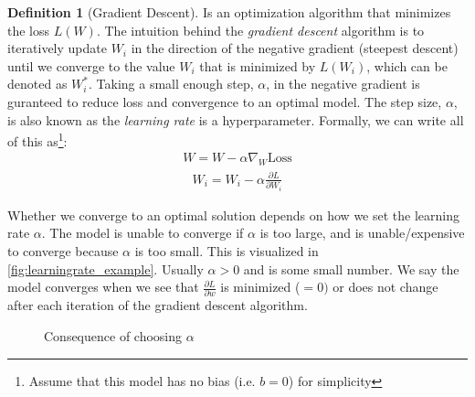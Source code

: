 \documentclass[11pt]{article}
\numberwithin{equation}{section}
\theoremstyle{definition}%
\newtheorem{definition}{Definition}[section]%
\begin{document}
\begin{definition}[Gradient Descent]
    Is an optimization algorithm that minimizes the loss $L(W)$. The intuition behind the \emph{gradient descent} algorithm is to iteratively update $W_i$ in the direction of the negative gradient (steepest descent) until we converge to the value $W_i$ that is minimized by $L(W_i)$, which can be denoted as $W_i^{\ast}$.  Taking a small enough step, $\alpha$, in the negative gradient is guranteed to reduce loss and convergence to an optimal model. The step size, $\alpha$, is also known as the \emph{learning rate} is a hyperparameter. Formally, we can write all of this as\footnote{Assume that this model has no bias (i.e. $b=0$) for simplicity}:
    \begin{align}
        W = W - \alpha \nabla_W \text{Loss}  
    \end{align}
    \begin{align}
        W_i = W_i - \alpha \frac{\partial L}{\partial W_i}  
    \end{align}
\end{definition}

Whether we converge to an optimal solution depends on how we set the learning rate $\alpha$. The model is unable to converge if $\alpha$ is too large, and is unable/expensive to converge because $\alpha$ is too small. This is visualized in \autoref{fig:learningrate_example}. Usually $\alpha > 0$ and is some small number. We say the model converges when we see that $\frac{\partial L}{\partial w}$ is minimized ($=0)$ or does not change after each iteration of the gradient descent algorithm.

\begin{figure}[h]%
    \centering
    \qquad
    \caption{Consequence of choosing $\alpha$ \cite{Cornell}}%
    \label{fig:learningrate_example}%
\end{figure}
\end{document}
